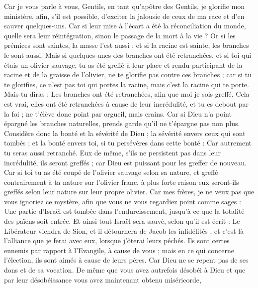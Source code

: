 \begin{multicols}{2}
Car je vous parle à vous, Gentils, en tant qu’apôtre des Gentils, je glorifie mon ministère,
afin, s’il est possible, d’exciter la jalousie de ceux de ma race et d’en sauver quelques-uns.
Car si leur mise à l’écart a été la réconciliation du monde, quelle sera leur réintégration, sinon le passage de la mort à la vie ?
Or si les prémices sont saintes, la masse l'est aussi ; et si la racine est sainte, les branches le sont aussi.
Mais si quelques-unes des branches ont été retranchées, et si toi qui étais un olivier sauvage, tu as été greffé à leur place et rendu participant de la racine et de la graisse de l'olivier,
ne te glorifie pas contre ces branches ; car si tu te glorifies, ce n'est pas toi qui portes la racine, mais c'est la racine qui te porte.
Mais tu diras : Les branches ont été retranchées, afin que moi je sois greffé.
Cela est vrai, elles ont été retranchées à cause de leur incrédulité, et tu es debout par la foi ; ne t'élève donc point par orgueil, mais crains.
Car si Dieu n'a point épargné les branches naturelles, prends garde qu'il ne t'épargne pas non plus.
Considère donc la bonté et la sévérité de Dieu ; la sévérité envers ceux qui sont tombés ; et la bonté envers toi, si tu persévères dans cette bonté : Car autrement tu seras aussi retranché.
Eux de même, s'ils ne persistent pas dans leur incrédulité, ils seront greffés ; car Dieu est puissant pour les greffer de nouveau.
Car si toi tu as été coupé de l'olivier sauvage selon sa nature, et greffé contrairement à ta nature sur l'olivier franc, à plus forte raison eux seront-ils greffés selon leur nature sur leur propre olivier.
Car mes frères, je ne veux pas que vous ignoriez ce mystère, afin que vous ne vous regardiez point comme sages : Une partie d’Israël est tombée dans l’endurcissement, jusqu’à ce que la totalité des païens soit entrée.
Et ainsi tout Israël sera sauvé, selon qu’il est écrit : Le Libérateur viendra de Sion, et il détournera de Jacob les infidélités ;
et c'est là l'alliance que je ferai avec eux, lorsque j'ôterai leurs péchés.
Ils sont certes ennemis par rapport à l'Evangile, à cause de vous ; mais en ce qui concerne l’élection, ils sont aimés à cause de leurs pères.
Car Dieu ne se repent pas de ses dons et de sa vocation.
De même que vous avez autrefois désobéi à Dieu et que par leur désobéissance vous avez maintenant obtenu miséricorde,

\end{multicols}

